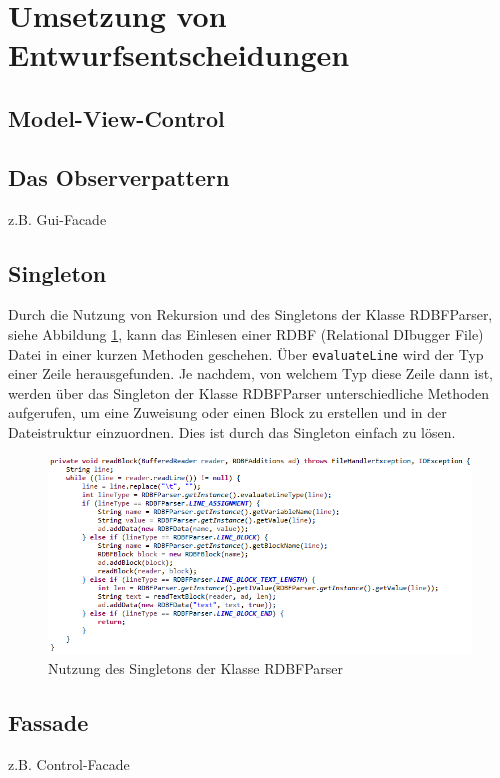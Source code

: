 \documentclass[parskip=full]{scrartcl}
\begin{document}
\section{Umsetzung von Entwurfsentscheidungen}
\subsection{Model-View-Control}
\subsection{Das Observerpattern}
z.B. Gui-Facade
\newpage
\subsection{Singleton}
Durch die Nutzung von Rekursion und des Singletons der Klasse RDBFParser, siehe Abbildung \ref{loadRDBF}, kann das Einlesen einer RDBF (Relational DIbugger File) Datei in einer kurzen Methoden geschehen.
Über \texttt{evaluateLine} wird der Typ einer Zeile herausgefunden. Je nachdem, von welchem Typ diese Zeile dann ist, werden über das Singleton der Klasse RDBFParser unterschiedliche Methoden aufgerufen, um eine Zuweisung oder einen Block zu erstellen und in der Dateistruktur einzuordnen. Dies ist durch das Singleton einfach zu lösen.
\begin{figure}[!h]
\includegraphics[width=1.0\textwidth]{document_data/loadRDBFFile.png}
\caption{Nutzung des Singletons der Klasse RDBFParser}
\label{loadRDBF}
\end{figure}

\subsection{Fassade}
z.B. Control-Facade

\newpage
\end{document}
